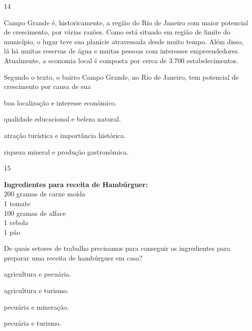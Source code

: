 \num{14}

\begin{myquote}
Campo Grande é, historicamente, a região do Rio de Janeiro com maior
potencial de crescimento, por várias razões. Como está situado em região de limite do município, o lugar teve sua planície atravessada desde muito tempo. Além disso, lá há muitas reservas de água e muitas pessoas com interesses empreendedores. Atualmente, a economia local é composta por cerca de 3.700 estabelecimentos. 
\end{myquote}

\pagebreak

Segundo o texto, o bairro Campo Grande, no Rio de Janeiro, tem potencial
de crescimento por causa de sua

\begin{escolha}
\item boa localização e interesse econômico.

\item qualidade educacional e beleza natural.

\item atração turística e importância histórica.

\item riqueza mineral e produção gastronômica.
\end{escolha}



\num{15}

\begin{myquote}
\textbf{Ingredientes para receita de Hambúrguer:}\\
200 gramas de carne moída\\
1 tomate\\
100 gramas de alface\\
1 cebola\\
1 pão
\end{myquote}

\noindent{}De quais setores de trabalho precisamos para conseguir os ingredientes
para preparar uma receita de hambúrguer em casa?

\begin{escolha}
\item agricultura e pecuária.

\item agricultura e turismo.

\item pecuária e mineração.

\item pecuária e turismo.
\end{escolha}


\pagebreak